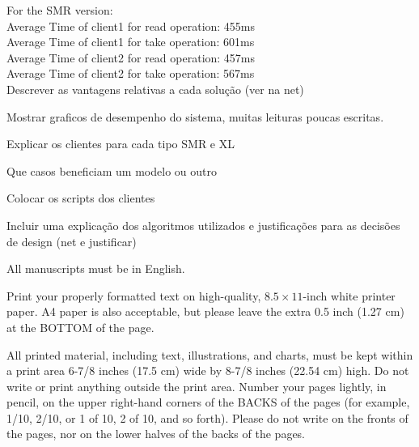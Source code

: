 \documentclass[times, 10pt,two column]{article}
\begin{document}
For the SMR version:\\
    Average Time of client1 for read operation: 455ms\\
    Average Time of client1 for take operation: 601ms\\
    Average Time of client2 for read operation: 457ms\\
    Average Time of client2 for take operation: 567ms\\

 
 


Descrever as vantagens relativas a cada solu\c{c}\~ao (ver na net)

Mostrar graficos de desempenho do sistema, muitas leituras poucas escritas.

Explicar os clientes para cada tipo SMR e XL

Que casos beneficiam um modelo ou outro

Colocar os scripts dos clientes

Incluir uma explica\c{c}\~ao dos algoritmos utilizados e justifica\c{c}\~oes para as decis\~oes de design (net e justificar)



All manuscripts must be in English.


Print your properly formatted text on high-quality, $8.5 \times 11$-inch 
white printer paper. A4 paper is also acceptable, but please leave the 
extra 0.5 inch (1.27 cm) at the BOTTOM of the page.


All printed material, including text, illustrations, and charts, must be 
kept within a print area 6-7/8 inches (17.5 cm) wide by 8-7/8 inches 
(22.54 cm) high. Do not write or print anything outside the print area. 
Number your pages lightly, in pencil, on the upper right-hand corners of 
the BACKS of the pages (for example, 1/10, 2/10, or 1 of 10, 2 of 10, and 
so forth). Please do not write on the fronts of the pages, nor on the 
lower halves of the backs of the pages.
\end{document}
